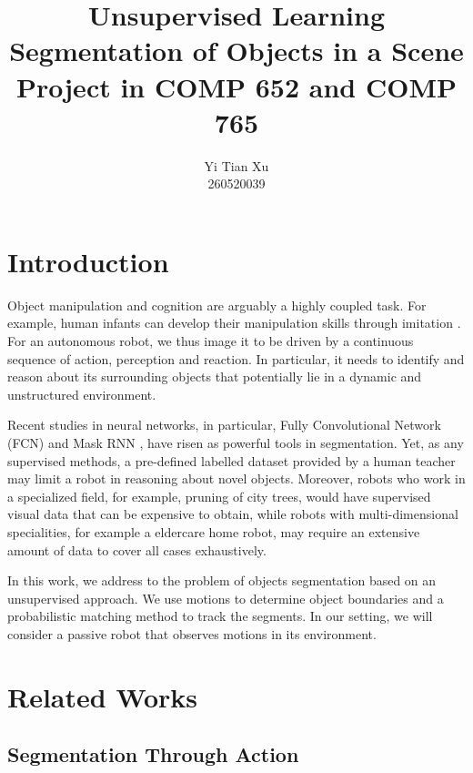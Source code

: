 \documentclass{article}
\begin{document}
\title{Unsupervised Learning Segmentation of Objects in a Scene\\
\large  Project in COMP 652 and COMP 765}
\author{Yi Tian Xu\\260520039}

\maketitle

\abstract{}


\section{Introduction}
Object manipulation and cognition are arguably a highly coupled task. For example, human infants can develop their manipulation skills through imitation \cite{cogn1}. For an autonomous robot, we thus image it to be driven by a continuous sequence of action, perception and reaction. In particular, it needs to identify and reason about its surrounding objects that potentially lie in a dynamic and unstructured environment. 

Recent studies in neural networks, in particular, Fully Convolutional Network (FCN) \cite{fcn} and Mask RNN \cite{rnn}, have risen as powerful tools in segmentation. Yet, as any supervised methods, a pre-defined labelled dataset provided by a human teacher may limit a robot in reasoning about novel objects. Moreover, robots who work in a specialized field, for example, pruning of city trees, would have supervised visual data that can be expensive to obtain, while robots with multi-dimensional specialities, for example a eldercare home robot, may require an extensive amount of data to cover all cases exhaustively.

In this work, we address to the problem of objects segmentation based on an unsupervised approach. We use motions to determine object boundaries and a probabilistic matching method to track the segments. In our setting, we will consider a passive robot that observes motions in its environment.

\section{Related Works}

\subsection{Segmentation Through Action}
\end{document}
